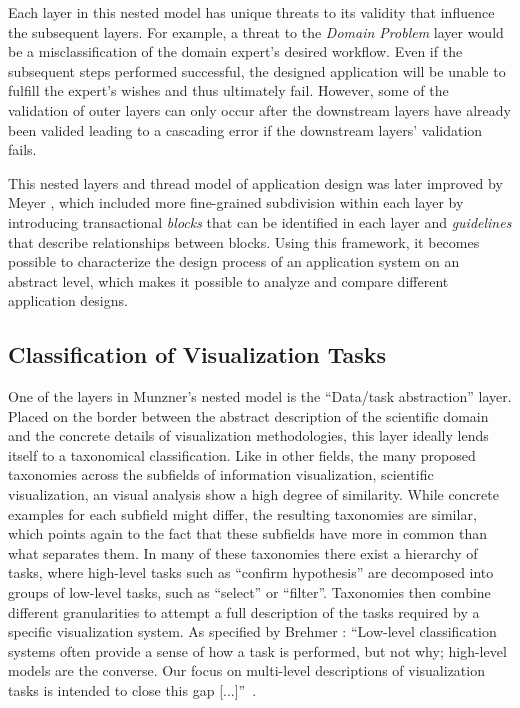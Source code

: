 Each layer in this nested model has unique threats to its validity that influence the subsequent layers.  For example, a threat to the \emph{Domain Problem} layer would be a misclassification of the domain expert's desired workflow.  Even if the subsequent steps performed successful, the designed application will be unable to fulfill the expert's wishes and thus ultimately fail.  However, some of the validation of outer layers can only occur after the downstream layers have already been valided leading to a cascading error if the downstream layers' validation fails.

This nested layers and thread model of application design was later improved by Meyer \etal , which included more fine-grained subdivision within each layer by introducing transactional \emph{blocks} that can be identified in each layer and \emph{guidelines} that describe relationships between blocks.  Using this framework, it becomes possible to characterize the design process of an application system on an abstract level, which makes it possible to analyze and compare different application designs.


\subsection{Classification of Visualization Tasks} \label{cha:intro:appl:tasks}
One of the layers in Munzner's nested model is the ``Data/task abstraction'' layer.  Placed on the border between the abstract description of the scientific domain and the concrete details of visualization methodologies, this layer ideally lends itself to a taxonomical classification.  Like in other fields, the many proposed taxonomies across the subfields of information visualization, scientific visualization, an visual analysis show a high degree of similarity.  While concrete examples for each subfield might differ, the resulting taxonomies are similar, which points again to the fact that these subfields have more in common than what separates them.  In many of these taxonomies there exist a hierarchy of tasks, where high-level tasks such as ``confirm hypothesis'' are decomposed into groups of low-level tasks, such as ``select'' or ``filter''.  Taxonomies then combine different granularities to attempt a full description of the tasks required by a specific visualization system.  As specified by Brehmer \etal : ``Low-level classification systems often provide a sense of how a task is performed, but not why; high-level models are the converse. Our focus on multi-level descriptions of visualization tasks is intended to close this gap [...]''~\cite{brehmer2013typology}.

